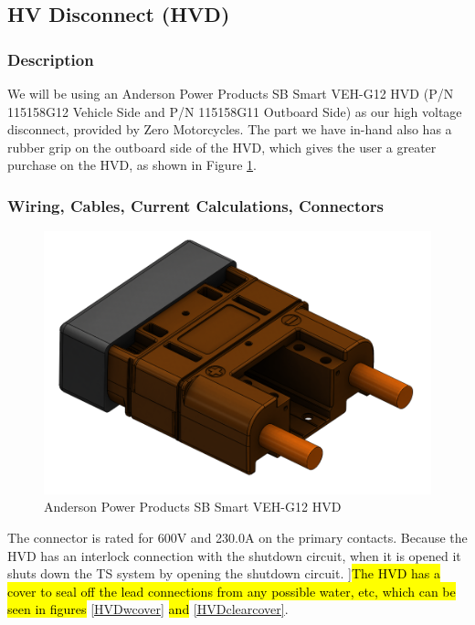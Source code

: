 \documentclass{article}
\DeclareRobustCommand{\hlr}[1]{{\sethlcolor{red}\hl{#1}}}
\begin{document}
    \subsection{HV Disconnect (HVD)} \label{hvdsection}

        \subsubsection{Description}

            We will be using an Anderson Power Products SB Smart VEH-G12 HVD (P/N 115158G12 Vehicle Side and P/N 115158G11 Outboard Side) as our high voltage disconnect, provided by Zero Motorcycles. The part we have in-hand also has a rubber grip on the outboard side of the HVD, which gives the user a greater purchase on the HVD, as shown in Figure \ref{HVDoneside}.

        \subsubsection{Wiring, Cables, Current Calculations, Connectors}

            \begin{figure}[H]
                \centering
                \includegraphics[width = 0.25 \textwidth]{anderson_hvd_interlock}
                \caption{Anderson Power Products SB Smart VEH-G12 HVD}
                \label{HVDoneside}
            \end{figure}


            The connector is rated for 600V and 230.0A on the primary contacts. Because the HVD has an interlock connection with the shutdown circuit, when it is opened it shuts down the TS system by opening the shutdown circuit. ]\hlr{The HVD has a cover to seal off the lead connections from any possible water, etc, which can be seen in figures} \ref{HVDwcover} \hlr{and} \ref{HVDclearcover}.
\end{document}

